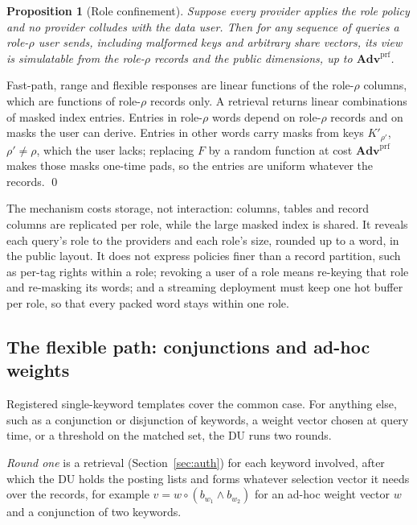 \documentclass[a4paper,fleqn]{cas-sc}
\newtheorem{proposition}{Proposition}
\newcommand{\advPRF}{\mathbf{Adv}^{\mathrm{prf}}}
\begin{document}
\begin{proposition}[Role confinement]
\label{prop:role}
Suppose every provider applies the role policy and no provider colludes with
the data user. Then for any sequence of queries a role-$\rho$ user sends,
including malformed keys and arbitrary share vectors, its view is simulatable
from the role-$\rho$ records and the public dimensions, up to
$\advPRF$.
\end{proposition}
\begin{pf}
Fast-path, range and flexible responses are linear functions of the
role-$\rho$ columns, which are functions of role-$\rho$ records only. A
retrieval returns linear combinations of masked index entries. Entries in
role-$\rho$ words depend on role-$\rho$ records and on masks the user can
derive. Entries in other words carry masks from keys $K'_{\rho'}$,
$\rho'\neq\rho$, which the user lacks; replacing $F$ by a random function at
cost $\advPRF$ makes those masks one-time pads, so the entries are uniform
whatever the records. \qed
\end{pf}

The mechanism costs storage, not interaction: columns, tables and record
columns are replicated per role, while the large masked index is shared. It
reveals each query's role to the providers and each role's size, rounded up to
a word, in the public layout. It does not express policies finer than a record
partition, such as per-tag rights within a role; revoking a user of a role
means re-keying that role and re-masking its words; and a streaming deployment
must keep one hot buffer per role, so that every packed word stays within one
role.

\subsection{The flexible path: conjunctions and ad-hoc weights}
\label{sec:flex}
Registered single-keyword templates cover the common case. For anything else,
such as a conjunction or disjunction of keywords, a weight vector chosen at
query time, or a threshold on the matched set, the DU runs two rounds.

\emph{Round one} is a retrieval (Section~\ref{sec:auth}) for each keyword
involved, after which the DU holds the posting lists and forms whatever
selection vector it needs over the records, for example
$v=w\circ(b_{w_1}\wedge b_{w_2})$ for an ad-hoc weight vector $w$ and a
conjunction of two keywords.
\end{document}

